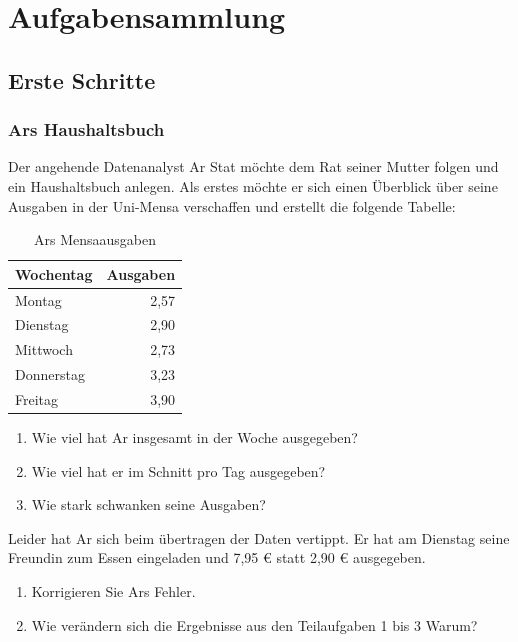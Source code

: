 \documentclass[]{book}
\providecommand{\tightlist}{%
  \setlength{\itemsep}{0pt}\setlength{\parskip}{0pt}}
\begin{document}
\hypertarget{aufgabensammlung}{%
\chapter{Aufgabensammlung}\label{aufgabensammlung}}

\hypertarget{erste-schritte}{%
\section{Erste Schritte}\label{erste-schritte}}

\hypertarget{ars-haushaltsbuch}{%
\subsection{Ars Haushaltsbuch}\label{ars-haushaltsbuch}}

Der angehende Datenanalyst Ar Stat möchte dem Rat seiner Mutter folgen und ein Haushaltsbuch anlegen. Als erstes möchte er sich einen Überblick über seine Ausgaben in der Uni-Mensa verschaffen und erstellt die folgende Tabelle:

\begin{table}

\caption{\label{tab:unnamed-chunk-43}Ars Mensaausgaben}
\centering
\begin{tabular}[t]{lr}
\toprule
Wochentag & Ausgaben\\
\midrule
Montag & 2,57\\
Dienstag & 2,90\\
Mittwoch & 2,73\\
Donnerstag & 3,23\\
Freitag & 3,90\\
\bottomrule
\end{tabular}
\end{table}

\begin{enumerate}
\def\labelenumi{\arabic{enumi}.}
\tightlist
\item
  Wie viel hat Ar insgesamt in der Woche ausgegeben?
\item
  Wie viel hat er im Schnitt pro Tag ausgegeben?
\item
  Wie stark schwanken seine Ausgaben?
\end{enumerate}

Leider hat Ar sich beim übertragen der Daten vertippt. Er hat am Dienstag seine Freundin zum Essen eingeladen und 7,95 € statt 2,90 € ausgegeben.

\begin{enumerate}
\def\labelenumi{\arabic{enumi}.}
\setcounter{enumi}{3}
\tightlist
\item
  Korrigieren Sie Ars Fehler.
\item
  Wie verändern sich die Ergebnisse aus den Teilaufgaben 1 bis 3 Warum?
\end{enumerate}
\end{document}
